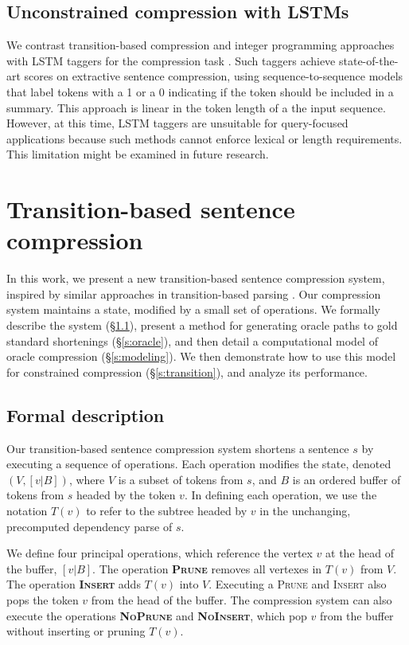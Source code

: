 \documentclass[11pt,a4paper]{article}
\begin{document}
\subsection{Unconstrained compression with LSTMs}

We contrast transition-based compression and integer programming approaches with LSTM taggers for the compression task \cite{filippova2015sentence}. Such taggers achieve state-of-the-art scores on extractive sentence compression, using sequence-to-sequence models that label tokens with a 1 or a 0 indicating if the token should be included in a summary. This approach is linear in the token length of a the input sequence. However, at this time, LSTM taggers are unsuitable for query-focused applications because such methods cannot enforce lexical or length requirements. This limitation might be examined in future research.

\section{Transition-based sentence compression}\label{s:system}

In this work, we present a new transition-based sentence compression system, inspired by similar approaches in transition-based parsing \cite{nivre2003,D14-1082}. Our compression system maintains a state, modified by a small set of operations. We formally describe the system (\S\ref{s:formal}), present a method for generating oracle paths to gold standard shortenings (\S\ref{s:oracle}), and then detail a computational model of oracle compression (\S\ref{s:modeling}). We then demonstrate how to use this model for constrained compression (\S\ref{s:transition}), and analyze its performance.

\subsection{Formal description}\label{s:formal}

Our transition-based sentence compression system shortens a sentence $s$ by executing a sequence of operations. Each operation modifies the state, denoted $(V,[v|B])$, where $V$ is a subset of tokens from $s$, and $B$ is an ordered buffer of tokens from $s$ headed by the token $v$. In defining each operation, we use the notation $T(v)$ to refer to the subtree headed by $v$ in the unchanging, precomputed dependency parse of $s$.

We define four principal operations, which reference the vertex $v$ at the head of the buffer, $[v|B]$. The operation \textbf{\textsc{Prune}} removes all vertexes in $T(v)$ from $V$. The operation \textbf{\textsc{Insert}} adds $T(v)$ into $V$. Executing a \textsc{Prune} and \textsc{Insert} also pops the token $v$ from the head of the buffer. The compression system can also execute the operations \textbf{\textsc{NoPrune}} and \textbf{\textsc{NoInsert}}, which pop $v$ from the buffer without inserting or pruning $T(v)$. 
\end{document}
